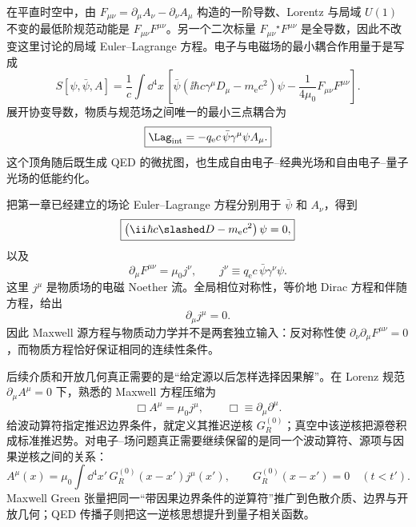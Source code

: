 在平直时空中，由 $F_{\mu\nu}=\partial_\mu A_\nu-\partial_\nu A_\mu$ 构造的一阶导数、Lorentz 与局域 $U(1)$ 不变的最低阶规范动能是 $F_{\mu\nu}F^{\mu\nu}$。另一个二次标量 $F_{\mu\nu}{}^\star\!F^{\mu\nu}$ 是全导数，因此不改变这里讨论的局域 Euler--Lagrange 方程。电子与电磁场的最小耦合作用量于是写成
\begin{equation}
 \boxed{
 S[\psi,\bar\psi,A]
 =\frac1c\int\dd^4 x\,
 \left[
 \bar\psi\left(\ii\hbar c\gamma^\mu D_\mu-m_{\mathrm e} c^2\right)\psi
 -\frac{1}{4\mu_0}F_{\mu\nu}F^{\mu\nu}
 \right].}
 \label{eq:maxwell-dirac-action}
\end{equation}
展开协变导数，物质与规范场之间唯一的最小三点耦合为
\begin{equation}
 \boxed{
 \Lag_{\rm int}
 =-q_{\mathrm e} c\,\bar\psi\gamma^\mu\psi A_\mu.}
 \label{eq:qed-interaction-lagrangian}
\end{equation}
这个顶角随后既生成 QED 的微扰图，也生成自由电子--经典光场和自由电子--量子光场的低能约化。

把第一章已经建立的场论 Euler--Lagrange 方程分别用于 $\bar\psi$ 和 $A_\nu$，得到
\begin{equation}
 \boxed{
 \left(\ii\hbar c\slashed D-m_{\mathrm e} c^2\right)\psi=0,}
 \label{eq:dirac-em}
\end{equation}
以及
\begin{equation}
 \boxed{
 \partial_\mu F^{\mu\nu}=\mu_0 j^\nu,
 \qquad
 j^\nu\equiv q_{\mathrm e} c\,\bar\psi\gamma^\nu\psi.}
 \label{eq:maxwell-source}
\end{equation}
这里 $j^\mu$ 是物质场的电磁 Noether 流。全局相位对称性，等价地 Dirac 方程和伴随方程，给出
\begin{equation}
 \boxed{\partial_\mu j^\mu=0.}
 \label{eq:current-conservation}
\end{equation}
因此 Maxwell 源方程与物质动力学并不是两套独立输入：反对称性使 $\partial_\nu\partial_\mu F^{\mu\nu}=0$，而物质方程恰好保证相同的连续性条件。

后续介质和开放几何真正需要的是“给定源以后怎样选择因果解”。在 Lorenz 规范 $\partial_\mu A^\mu=0$ 下，熟悉的 Maxwell 方程压缩为
\begin{equation*}
 \Box A^\mu=\mu_0j^\mu,
 \qquad
 \Box\equiv\partial_\mu\partial^\mu.
\end{equation*}
给波动算符指定推迟边界条件，就定义其推迟逆核 $G_R^{(0)}$；真空中该逆核把源卷积成标准推迟势。对电子--场问题真正需要继续保留的是同一个波动算符、源项与因果逆核之间的关系：
\begin{equation*}
 A^\mu(x)=\mu_0\int\dd^4 x'\,G_R^{(0)}(x-x')j^\mu(x'),
 \qquad
 G_R^{(0)}(x-x')=0\quad(t<t').
\end{equation*}
Maxwell Green 张量把同一“带因果边界条件的逆算符”推广到色散介质、边界与开放几何；QED 传播子则把这一逆核思想提升到量子相关函数。

